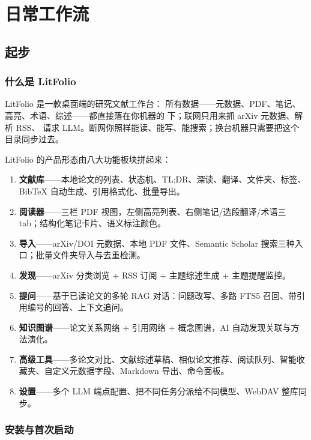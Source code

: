 \part{日常工作流}

\chapter{起步}
\label{ch:start}

\section{什么是 LitFolio}

LitFolio 是一款桌面端的研究文献工作台：
所有数据——元数据、PDF、笔记、高亮、术语、综述——都直接落在你机器的
 下；联网只用来抓 arXiv 元数据、解析 RSS、
请求 LLM。断网你照样能读、能写、能搜索；换台机器只需要把这个目录同步过去。

LitFolio 的产品形态由八大功能板块拼起来：

\begin{enumerate}
  \item \textbf{文献库}——本地论文的列表、状态机、TL;DR、深读、翻译、文件夹、标签、BibTeX 自动生成、引用格式化、批量导出。
  \item \textbf{阅读器}——三栏 PDF 视图，左侧高亮列表、右侧笔记/选段翻译/术语三 tab；结构化笔记卡片、语义标注颜色。
  \item \textbf{导入}——arXiv/DOI 元数据、本地 PDF 文件、Semantic Scholar 搜索三种入口；批量文件夹导入与去重检测。
  \item \textbf{发现}——arXiv 分类浏览 + RSS 订阅 + 主题综述生成 + 主题提醒监控。
  \item \textbf{提问}——基于已读论文的多轮 RAG 对话：问题改写、多路 FTS5 召回、带引用编号的回答、上下文追问。
  \item \textbf{知识图谱}——论文关系网络 + 引用网络 + 概念图谱，AI 自动发现关联与方法演化。
  \item \textbf{高级工具}——多论文对比、文献综述草稿、相似论文推荐、阅读队列、智能收藏夹、自定义元数据字段、Markdown 导出、命令面板。
  \item \textbf{设置}——多个 LLM 端点配置、把不同任务分派给不同模型、WebDAV 整库同步。
\end{enumerate}

\section{安装与首次启动}

